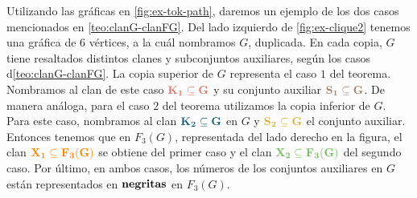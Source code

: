 Utilizando las gr\'aficas en \cref{fig:ex-tok-path}, daremos un ejemplo de los
dos casos mencionados en \cref{teo:clanG-clanFG}. Del lado izquierdo de
\cref{fig:ex-clique2} tenemos una gr\'afica de $6$ v\'ertices, a la cu\'al
nombramos $G$, duplicada. En cada copia, $G$ tiene resaltados distintos clanes y
subconjuntos auxiliares, seg\'un los casos d\cref{teo:clanG-clanFG}.
La copia superior de $G$ representa el caso $1$ del teorema. Nombramos al clan
de este caso ${\color{salmon}\bf K_1 \subseteq G}$ y su conjunto auxiliar
${\color{baige}\bf S_1\subseteq G}$. De manera an\'aloga, para el caso $2$ del
teorema utilizamos la copia inferior de $G$. Para este caso, nombramos al clan
${\color{azulOscuro}\bf K_2\subseteq G}$ en $G$ y ${\color{oro}\bf S_2\subseteq G}$ el
conjunto auxiliar. Entonces tenemos que en $F_3(G)$, representada del lado
derecho en la figura, el clan ${\color{naranja}\bf X_1\subseteq F_3(G)}$ se obtiene
del primer caso y el clan ${\color{verde}\bf X_2 \subseteq F_3(G)}$ del segundo
caso. Por \'ultimo, en ambos casos, los n\'umeros de los conjuntos auxiliares en
$G$ est\'an representados en ${\bf negritas}$ en $F_3(G)$.

